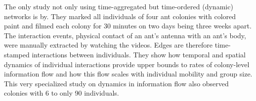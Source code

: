The only study not only using time-aggregated but time-ordered (dynamic) networks is by\textcite{blonder2011time}.
They marked all individuals of four ant colonies with colored paint and filmed each colony for 30 minutes on two days being three weeks apart.
The interaction events, physical contact of an ant's antenna with an ant's body, were manually extracted by watching the videos. Edges are therefore time-stamped interactions between individuals.
They show how temporal and spatial dynamics of individual interactions provide upper bounds to rates of colony-level information flow and how this flow scales with individual mobility and group size.
This very specialized study on dynamics in information flow also observed colonies with 6 to only 90 individuals.